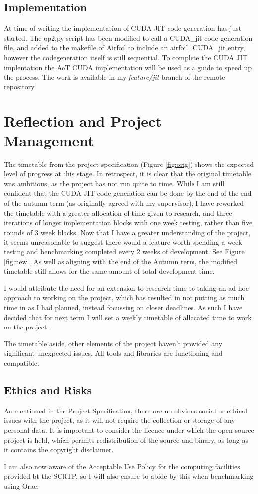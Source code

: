 \documentclass[11pt]{article}
\begin{document}
\subsection*{Implementation}
At time of writing the implementation of CUDA JIT code generation has just started. The op2.py script has been modified to call a CUDA\_jit code generation file, and added to the makefile of Airfoil to include an airfoil\_CUDA\_jit entry, however the codegeneration itself is still sequential. To complete the CUDA JIT implentation the AoT CUDA implementation will be used as a guide to speed up the process. The work is available in my \textit{feature/jit} branch of the remote repository.

\section*{Reflection and Project Management}
The timetable from the project specification (Figure \ref{fig:orig}) shows the expected level of progress at this stage. In retrospect, it is clear that the original timetable was ambitious, as the project has not run quite to time. While I am still confident that the CUDA JIT code generation can be done by the end of the end of the autumn term (as originally agreed with my supervisor), I have reworked the timetable with a greater allocation of time given to research, and three iterations of longer implementation blocks with one week testing, rather than five rounds of 3 week blocks. Now that I have a greater understanding of the project, it seems unreasonable to suggest there would a feature worth spending a week testing and benchmarking completed every 2 weeks of development. See Figure \ref{fig:new}. As well as aligning with the end of the Autumn term, the modified timetable still allows for the same amount of total development time.
\par I would attribute the need for an extension to research time to taking an ad hoc approach to working on the project, which has resulted in not putting as much time in as I had planned, instead focussing on closer deadlines. As such I have decided that for next term I will set a weekly timetable of allocated time to work on the project.
\par The timetable aside, other elements of the project haven't provided any significant unexpected issues. All tools and libraries are functioning and compatible.

\subsection*{Ethics and Risks}
As mentioned in the Project Specification, there are no obvious social or ethical issues with the project, as it will not require the collection or storage of any personal data. It is important to consider the licence under which the open source project is held, which permits redistribution of the source and binary, as long as it contains the copyright disclaimer.
\par I am also now aware of the Acceptable Use Policy\cite{aup} for the computing facilities provided bt the SCRTP, so I will also ensure to abide by this when benchmarking using Orac.
\end{document}
